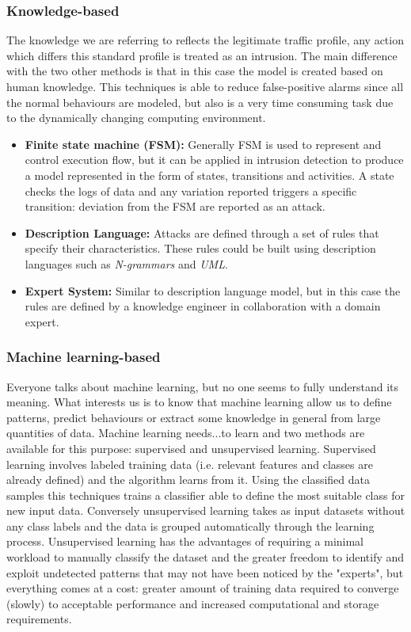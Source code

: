 \subsubsection{Knowledge-based}
The knowledge we are referring to reflects the legitimate traffic profile, any action which differs this standard profile is treated as an intrusion. The main difference with the two other methods is that in this case the model is created based on human knowledge. This techniques is able to reduce false-positive alarms since all the normal behaviours are modeled, but also is a very time consuming task due to the dynamically changing computing environment.
\begin{itemize}
    \item \textbf{Finite state machine (FSM):} Generally FSM is used to represent and control execution flow, but it can be applied in intrusion detection to produce a model represented in the form of states, transitions and activities. A state checks the logs of data and any variation reported triggers a specific transition: deviation from the FSM are reported as an attack.
    \item \textbf{Description Language:} Attacks are defined through a set of rules that specify their characteristics. These rules could be built using description languages such as \textit{N-grammars} and \textit{UML}.
    \item \textbf{Expert System:} Similar to description language model, but in this case the rules are defined by a knowledge engineer in collaboration with a domain expert.
\end{itemize}
\subsubsection{Machine learning-based}
Everyone talks about machine learning, but no one seems to fully understand its meaning. What interests us is to know that machine learning allow us to define patterns, predict behaviours or extract some knowledge in general from large quantities of data. Machine learning needs...to learn and two methods are available for this purpose: supervised and unsupervised learning. Supervised learning involves labeled training data (i.e. relevant features and classes are already defined) and the algorithm learns from it. Using the classified data samples this techniques trains a classifier able to define the most suitable class for new input data. Conversely unsupervised learning takes as input datasets without any class labels and the data is grouped automatically through the learning process. Unsupervised learning  has the advantages of requiring a minimal workload to manually classify the dataset and the greater freedom to identify and exploit undetected patterns that may not have been noticed by the "experts", but everything comes at a cost: greater amount of training data required to converge (slowly) to acceptable performance and increased computational and storage requirements.

